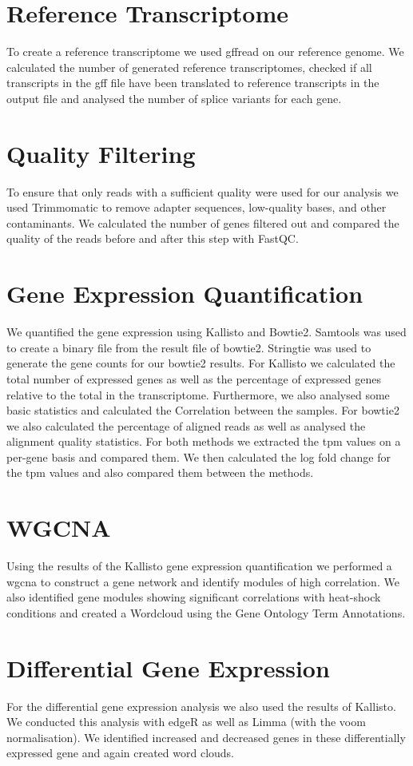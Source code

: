 \section{Reference Transcriptome}
To create a reference transcriptome we used gffread on our reference genome. 
We calculated the number of generated reference
transcriptomes, checked if all transcripts in the gff file have been translated 
to reference transcripts in the output file
and analysed the number of splice variants for each gene.

\section{Quality Filtering}
To ensure that only reads with a sufficient quality were used for our analysis we used Trimmomatic to remove
adapter sequences, low-quality bases, and other contaminants. We calculated the number of genes filtered out
and compared the quality of the reads before and after this step with FastQC.

\section{Gene Expression Quantification}
We quantified the gene expression using Kallisto and Bowtie2.
Samtools was used to create a binary file from the result file of bowtie2. Stringtie was used
to generate the gene counts for our bowtie2 results.
For Kallisto we calculated the total number of expressed genes as well as the percentage of expressed
genes relative to the total in the transcriptome. Furthermore, we also analysed some basic statistics and
calculated the Correlation between the samples.
For bowtie2 we also calculated the percentage of aligned reads as well as analysed the
alignment quality statistics.
For both methods we extracted the \gls{tpm} values on a per-gene basis and compared them. 
We then calculated the log fold change for the \gls{tpm} values and also compared them between the 
methods.

\section{WGCNA}
Using the results of the Kallisto gene expression quantification we performed a \gls{wgcna} to construct a gene network and identify modules of high 
correlation. We also identified gene modules showing significant correlations with
heat-shock conditions and created a Wordcloud using the Gene Ontology Term Annotations. 


\section{Differential Gene Expression}
For the differential gene expression analysis we also used the results of Kallisto.
We conducted this analysis with edgeR as well as Limma (with the voom normalisation). 
We identified increased and decreased genes in these differentially expressed gene 
and again created word clouds. 

